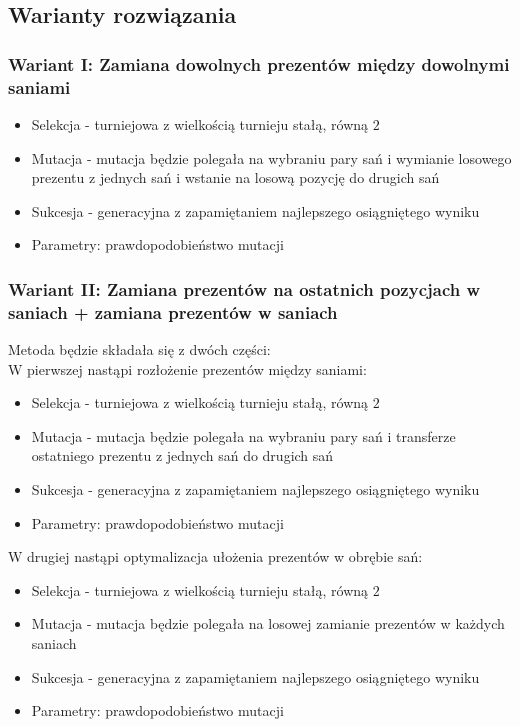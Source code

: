 \documentclass[titlepage]{article}
\begin{document}
        \subsection{
            Warianty rozwiązania
        }
            \subsubsection{
                Wariant I: Zamiana dowolnych prezentów między dowolnymi saniami
            }
                \begin{itemize}
                    \item Selekcja - turniejowa z wielkością turnieju stałą, równą $2$
                    \item Mutacja - mutacja będzie polegała na wybraniu pary sań i wymianie losowego prezentu z jednych sań i wstanie na losową pozycję do drugich sań
                    \item Sukcesja - generacyjna z zapamiętaniem najlepszego osiągniętego wyniku
                    \item Parametry: prawdopodobieństwo mutacji
                \end{itemize}

            \subsubsection{
                Wariant II: Zamiana prezentów na ostatnich pozycjach w saniach + zamiana prezentów w saniach
            }
                Metoda będzie składała się z dwóch części: \\

                W pierwszej nastąpi rozłożenie prezentów między saniami:
                \begin{itemize}
                    \item Selekcja - turniejowa z wielkością turnieju stałą, równą $2$
                    \item Mutacja - mutacja będzie polegała na wybraniu pary sań i transferze ostatniego prezentu z jednych sań do drugich sań
                    \item Sukcesja - generacyjna z zapamiętaniem najlepszego osiągniętego wyniku
                    \item Parametry: prawdopodobieństwo mutacji
                \end{itemize}

                \noindent W drugiej nastąpi optymalizacja ułożenia prezentów w obrębie sań:
                \begin{itemize}
                    \item Selekcja - turniejowa z wielkością turnieju stałą, równą $2$
                    \item Mutacja - mutacja będzie polegała na losowej zamianie prezentów w każdych saniach
                    \item Sukcesja - generacyjna z zapamiętaniem najlepszego osiągniętego wyniku
                    \item Parametry: prawdopodobieństwo mutacji 
                \end{itemize}
\end{document}
